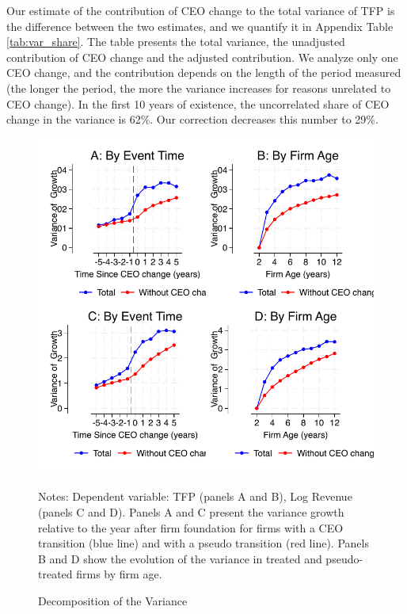 \documentclass[11pt,a4paper]{article}
\begin{document}
Our estimate of the contribution of CEO change to the total variance of TFP is the difference between the two estimates, and we quantify it in Appendix Table \ref{tab:var_share}. The table presents the total variance, the unadjusted contribution of CEO change and the adjusted contribution. We analyze only one CEO change, and the contribution depends on the length of the period measured (the longer the period, the more the variance increases for reasons unrelated to CEO change). In the first 10 years of existence, the uncorrelated share of CEO change in the variance is 62\%. Our correction decreases this number to 29\%.


\begin{figure}[htbp]
\centering
\includegraphics[width=\textwidth]{figure/figure3.pdf}
\label{fig:variance_decomp}
\begin{minipage}{15cm}
\caption{Decomposition of the Variance}
\vspace{.2cm}
\footnotesize Notes: Dependent variable: TFP (panels A and B), Log Revenue (panels C and D). Panels A and C present the variance growth relative to the year after firm foundation for firms with a CEO transition (blue line) and with a pseudo transition (red line). Panels B and D show the evolution of the variance in treated and pseudo-treated firms by firm age. 
\end{minipage}
\end{figure}
\end{document}
